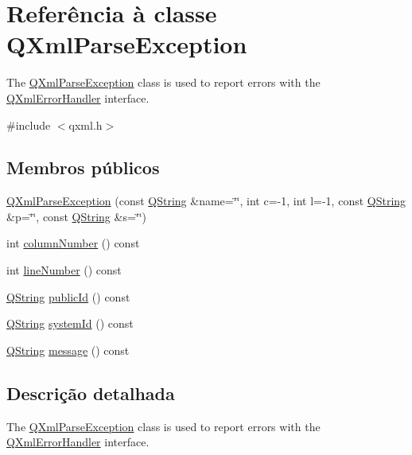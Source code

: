 \hypertarget{class_q_xml_parse_exception}{\section{Referência à classe Q\-Xml\-Parse\-Exception}
\label{class_q_xml_parse_exception}
}


The \hyperlink{class_q_xml_parse_exception}{Q\-Xml\-Parse\-Exception} class is used to report errors with the \hyperlink{class_q_xml_error_handler}{Q\-Xml\-Error\-Handler} interface.  




{\ttfamily \#include $<$qxml.\-h$>$}

\subsection*{Membros públicos}
\begin{DoxyCompactItemize}
\item 
\hyperlink{class_q_xml_parse_exception_a2dc0c3d7db4afc2c0687b27cd06c90a9}{Q\-Xml\-Parse\-Exception} (const \hyperlink{class_q_string}{Q\-String} \&name=\char`\"{}\char`\"{}, int c=-\/1, int l=-\/1, const \hyperlink{class_q_string}{Q\-String} \&p=\char`\"{}\char`\"{}, const \hyperlink{class_q_string}{Q\-String} \&s=\char`\"{}\char`\"{})
\item 
int \hyperlink{class_q_xml_parse_exception_aaa9653f1c80b3cf9f299d237bc265fd8}{column\-Number} () const 
\item 
int \hyperlink{class_q_xml_parse_exception_acc31ac294f033ecd0803085e55ed6d24}{line\-Number} () const 
\item 
\hyperlink{class_q_string}{Q\-String} \hyperlink{class_q_xml_parse_exception_a2cb470247e6c830c0942cd28743b984b}{public\-Id} () const 
\item 
\hyperlink{class_q_string}{Q\-String} \hyperlink{class_q_xml_parse_exception_abf0d81ce1a86a472a2dbbd581631baca}{system\-Id} () const 
\item 
\hyperlink{class_q_string}{Q\-String} \hyperlink{class_q_xml_parse_exception_aba2e3009745c37baeaf086e1bc6a3b8d}{message} () const 
\end{DoxyCompactItemize}


\subsection{Descrição detalhada}
The \hyperlink{class_q_xml_parse_exception}{Q\-Xml\-Parse\-Exception} class is used to report errors with the \hyperlink{class_q_xml_error_handler}{Q\-Xml\-Error\-Handler} interface. 

